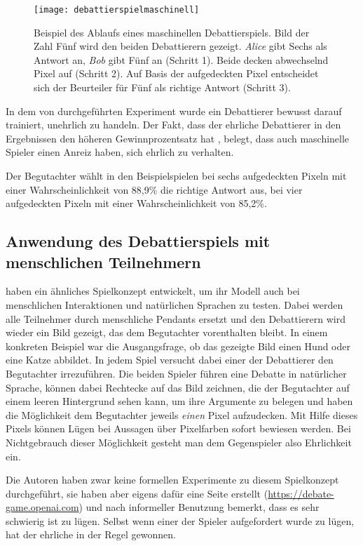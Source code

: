 \begin{figure}
  \texttt{[image: debattierspielmaschinell]}
  \caption{Beispiel des Ablaufs eines maschinellen Debattierspiels. Bild der Zahl Fünf wird den beiden Debattierern gezeigt. \emph{Alice} gibt Sechs als Antwort an, \emph{Bob} gibt Fünf an (Schritt 1). Beide decken abwechselnd Pixel auf (Schritt 2). Auf Basis der aufgedeckten Pixel entscheidet sich der Beurteiler für Fünf als richtige Antwort (Schritt 3). }
  \label{debattierspielmaschinellimg}
\end{figure}


In dem von \citeauthor{irving_ai_2018} durchgeführten Experiment wurde ein Debattierer bewusst darauf trainiert, unehrlich zu handeln. Der Fakt, dass der ehrliche Debattierer in den Ergebnissen den höheren Gewinnprozentsatz hat , belegt, dass auch maschinelle Spieler einen Anreiz haben, sich ehrlich zu verhalten.

Der Begutachter wählt in den Beispielspielen bei sechs aufgedeckten Pixeln mit einer Wahrscheinlichkeit von 88,9\% die richtige Antwort aus, bei vier aufgedeckten Pixeln mit einer Wahrscheinlichkeit von 85,2\%.

\subsection{Anwendung des Debattierspiels mit menschlichen Teilnehmern}

\citeauthor{irving_ai_2018} haben ein ähnliches Spielkonzept entwickelt, um ihr Modell auch bei menschlichen Interaktionen und natürlichen Sprachen zu testen. Dabei werden alle Teilnehmer durch menschliche Pendants ersetzt und den Debattierern wird wieder ein Bild gezeigt, das dem Begutachter vorenthalten bleibt. In einem konkreten Beispiel war die Ausgangsfrage, ob das gezeigte Bild einen Hund oder eine Katze abbildet. In jedem Spiel versucht dabei einer der Debattierer den Begutachter irrezuführen. Die beiden Spieler führen eine Debatte in natürlicher Sprache, können dabei Rechtecke auf das Bild zeichnen, die der Begutachter auf einem leeren Hintergrund sehen kann, um ihre Argumente zu belegen und haben die Möglichkeit dem Begutachter jeweils \emph{einen} Pixel aufzudecken. Mit Hilfe dieses Pixels können Lügen bei Aussagen über Pixelfarben sofort bewiesen werden. Bei Nichtgebrauch dieser Möglichkeit gesteht man dem Gegenspieler also Ehrlichkeit ein.

Die Autoren haben zwar keine formellen Experimente zu diesem Spielkonzept durchgeführt, sie haben aber eigens dafür eine Seite erstellt (\url{https://debate-game.openai.com}) und nach informeller Benutzung bemerkt, dass es sehr schwierig ist zu lügen. Selbst wenn einer der Spieler aufgefordert wurde zu lügen, hat der ehrliche in der Regel gewonnen.

